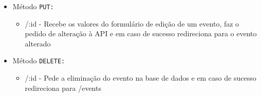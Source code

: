 \begin{itemize}
\begin{itemize}
                \end{itemize}
            \item Método \texttt{PUT:}
                \begin{itemize}
                    \item /:id - Recebe os valores do formulário de edição de um evento, faz o pedido de alteração à API e em caso de sucesso redireciona para o evento alterado
                \end{itemize}
            \item Método \texttt{DELETE:}
                \begin{itemize}
                    \item /:id -  Pede a eliminação do evento na base de dados e em caso de sucesso redireciona para /events
                \end{itemize}
        \end{itemize}

